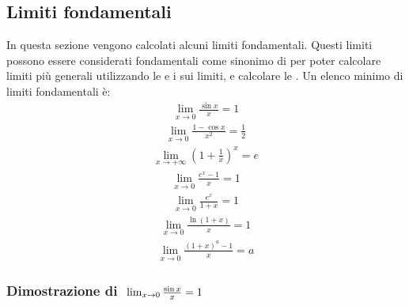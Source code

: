 \documentclass[letterpaper,10pt,italian]{jupyterBook}
\begin{document}
\subsection{Limiti fondamentali}
\label{\detokenize{ch/infinitesimal_calculus/analysis:limiti-fondamentali}}\label{\detokenize{ch/infinitesimal_calculus/analysis:infinitesimal-calculus-limits-fund}}
\sphinxAtStartPar
In questa sezione vengono calcolati alcuni limiti fondamentali. Questi limiti possono essere considerati fondamentali come sinonimo di  per poter calcolare limiti più generali utilizzando le {\hyperref[\detokenize{ch/infinitesimal_calculus/analysis:infinitesimal-calculus-limits-thms-operations}]{}} e i {\hyperref[\detokenize{ch/infinitesimal_calculus/analysis:infinitesimal-calculus-limits-thms}]{}} sui limiti, e calcolare le {\hyperref[\detokenize{ch/infinitesimal_calculus/derivatives:infinitesimal-calculus-derivatives-fund}]{}}. Un elenco minimo di limiti fondamentali è:
\begin{equation*}
\begin{split} \lim_{x \rightarrow 0} \frac{\sin x}{x} = 1 \end{split}
\end{equation*}\begin{equation*}
\begin{split} \lim_{x \rightarrow 0} \frac{1 - \cos x}{x^2} = \frac{1}{2} \end{split}
\end{equation*}\begin{equation*}
\begin{split} \lim_{x \rightarrow +\infty} \left( 1 + \frac{1}{x} \right)^x = e \end{split}
\end{equation*}\begin{equation*}
\begin{split} \lim_{x \rightarrow 0} \frac{e^x - 1}{x}= 1 \end{split}
\end{equation*}\begin{equation*}
\begin{split} \lim_{x \rightarrow 0} \frac{e^x}{1+x}= 1 \end{split}
\end{equation*}\begin{equation*}
\begin{split} \lim_{x \rightarrow 0} \frac{\ln (1+x)}{x} = 1 \end{split}
\end{equation*}\begin{equation*}
\begin{split} \lim_{x \rightarrow 0} \frac{(1+x)^a - 1}{x} = a \end{split}
\end{equation*}\subsubsection*{Dimostrazione di \protect\(\ \lim_{x \rightarrow 0} \frac{\sin x}{x} = 1 \protect\)}
\end{document}
